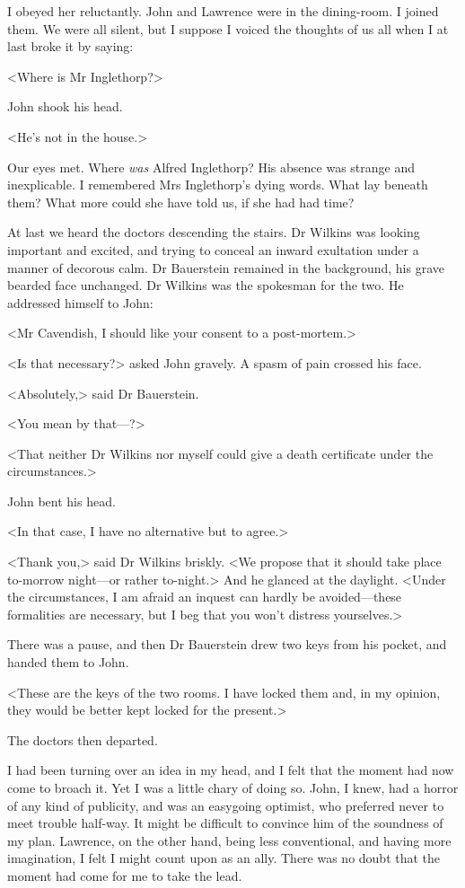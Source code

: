  I obeyed her reluctantly. John and Lawrence were in the dining-room. I joined them. We were all silent, but I suppose I voiced the thoughts of us all when I at last broke it by saying: 

 <Where is Mr Inglethorp?> 

 John shook his head. 

 <He's not in the house.> 

 Our eyes met. Where \emph{was} Alfred Inglethorp? His absence was strange and inexplicable. I remembered Mrs Inglethorp's dying words. What lay beneath them? What more could she have told us, if she had had time? 

 At last we heard the doctors descending the stairs. Dr Wilkins was looking important and excited, and trying to conceal an inward exultation under a manner of decorous calm. Dr Bauerstein remained in the background, his grave bearded face unchanged. Dr Wilkins was the spokesman for the two. He addressed himself to John: 

 <Mr Cavendish, I should like your consent to a post-mortem.> 

 <Is that necessary?> asked John gravely. A spasm of pain crossed his face. 

 <Absolutely,> said Dr Bauerstein. 

 <You mean by that—?> 

 <That neither Dr Wilkins nor myself could give a death certificate under the circumstances.> 

 John bent his head. 

 <In that case, I have no alternative but to agree.> 

 <Thank you,> said Dr Wilkins briskly. <We propose that it should take place to-morrow night—or rather to-night.> And he glanced at the daylight. <Under the circumstances, I am afraid an inquest can hardly be avoided—these formalities are necessary, but I beg that you won't distress yourselves.> 

 There was a pause, and then Dr Bauerstein drew two keys from his pocket, and handed them to John. 

 <These are the keys of the two rooms. I have locked them and, in my opinion, they would be better kept locked for the present.> 

 The doctors then departed. 

 I had been turning over an idea in my head, and I felt that the moment had now come to broach it. Yet I was a little chary of doing so. John, I knew, had a horror of any kind of publicity, and was an easygoing optimist, who preferred never to meet trouble half-way. It might be difficult to convince him of the soundness of my plan. Lawrence, on the other hand, being less conventional, and having more imagination, I felt I might count upon as an ally. There was no doubt that the moment had come for me to take the lead. 

